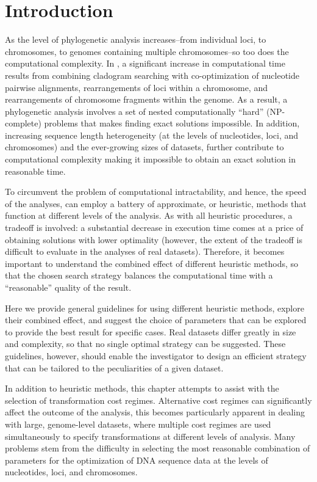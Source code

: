 \section{Introduction}

As the level of phylogenetic analysis increases--from individual loci, to chromosomes, to genomes containing multiple 
chromosomes--so too does the computational complexity. In \poy, a significant increase in computational time results from 
combining cladogram searching with co-optimization of nucleotide pairwise alignments, 
rearrangements of loci within a chromosome, and rearrangements of chromosome fragments within the genome. 
As a result, a phylogenetic analysis involves a set of nested computationally ``hard'' (NP-complete) problems that 
makes finding exact solutions impossible. In addition, increasing sequence length heterogeneity (at the levels of 
nucleotides, loci, and chromosomes) and the ever-growing sizes of datasets, further contribute to computational 
complexity making it impossible to obtain an exact solution in reasonable time.

To circumvent the problem of computational intractability, and hence, the speed of the analyses, \poy can employ a 
battery of approximate, or heuristic, methods that function at different levels of the analysis. As with all heuristic procedures, 
a tradeoff is involved: a substantial decrease in execution time comes at a price of obtaining solutions with lower optimality 
(however, the extent of the tradeoff is difficult to evaluate in the analyses of real datasets). Therefore, it becomes important 
to understand the combined effect of different heuristic methods, so that the chosen search strategy balances the computational 
time with a ``reasonable'' quality of the result.

Here we provide general guidelines for using different heuristic methods, explore their combined effect, and suggest the 
choice of parameters that can be explored to provide the best result for specific cases. Real datasets differ greatly in size 
and complexity, so that no single optimal strategy can be suggested. These guidelines, however, should enable the 
investigator to design an efficient strategy that can be tailored to the peculiarities of a given dataset.

In addition to heuristic methods, this chapter attempts to assist with the selection of transformation cost regimes. 
Alternative cost regimes can significantly affect the outcome of the analysis, this becomes particularly apparent in 
dealing with large, genome-level datasets, where multiple cost regimes are used simultaneously to specify transformations 
at different levels of analysis. Many problems stem from the difficulty in selecting the most reasonable combination of parameters 
for the optimization of DNA sequence data at the levels of nucleotides, loci, and chromosomes.

